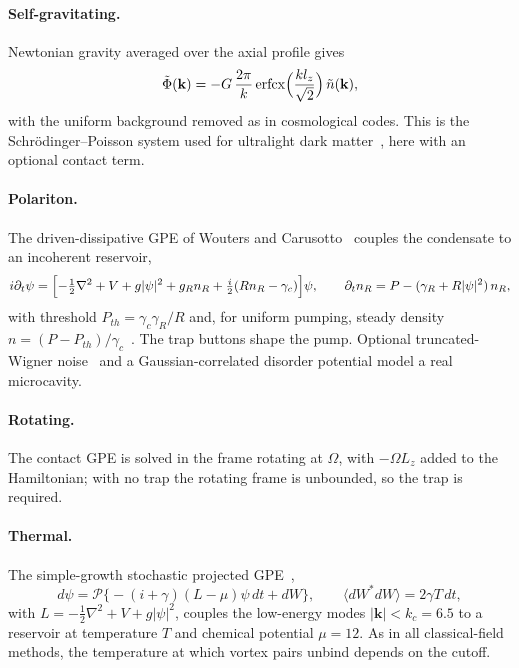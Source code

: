 \documentclass[11pt,a4paper]{article}
\begin{document}
\paragraph{Self-gravitating.} Newtonian gravity averaged over the axial profile gives
\begin{equation}
\tilde\Phi(\mathbf k)=-G\,\frac{2\pi}{k}\operatorname{erfcx}\Bigl(\frac{kl_z}{\sqrt2}\Bigr)\,\tilde n(\mathbf k),
\end{equation}
with the uniform background removed as in cosmological codes. This is the Schr\"odinger--Poisson system used for ultralight dark matter~\cite{hui2017,schive}, here with an optional contact term.

\paragraph{Polariton.} The driven-dissipative GPE of Wouters and Carusotto~\cite{woucar} couples the condensate to an incoherent reservoir,
\begin{equation}
i\partial_t\psi = \Bigl[-\tfrac12\nabla^2+V+g|\psi|^2+g_Rn_R+\tfrac i2(Rn_R-\gamma_c)\Bigr]\psi,\qquad \partial_tn_R = P-(\gamma_R+R|\psi|^2)\,n_R ,
\end{equation}
with threshold $P_{th}=\gamma_c\gamma_R/R$ and, for uniform pumping, steady density $n=(P-P_{th})/\gamma_c$~\cite{carusottociuti}. The trap buttons shape the pump. Optional truncated-Wigner noise~\cite{wousavona} and a Gaussian-correlated disorder potential model a real microcavity.

\paragraph{Rotating.} The contact GPE is solved in the frame rotating at $\Omega$, with $-\Omega L_z$ added to the Hamiltonian; with no trap the rotating frame is unbounded, so the trap is required.

\paragraph{Thermal.} The simple-growth stochastic projected GPE~\cite{gardinerdavis,bradley,blakie},
\begin{equation}
d\psi=\mathcal P\bigl\{-(i+\gamma)(L-\mu)\psi\,dt+dW\bigr\},\qquad \langle dW^*dW\rangle=2\gamma T\,dt,
\end{equation}
with $L=-\tfrac12\nabla^2+V+g|\psi|^2$, couples the low-energy modes $|\mathbf k|<k_c=6.5$ to a reservoir at temperature $T$ and chemical potential $\mu=12$. As in all classical-field methods, the temperature at which vortex pairs unbind depends on the cutoff.
\end{document}
